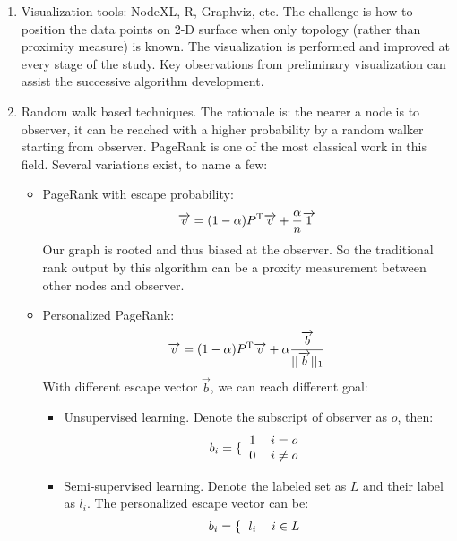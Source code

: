 \documentclass[11pt,a4paper]{article}
\begin{document}
\begin{enumerate}
	\item Visualization tools: NodeXL, R, Graphviz, etc. The challenge is
	how to position the data points on 2-D surface when only topology
	(rather than proximity measure) is 
	known. The visualization is performed and improved at every stage of 
	the study. Key observations from preliminary visualization can assist 
	the successive algorithm development. 
	\item Random walk based techniques. The rationale is: the nearer a node
	is to observer, it can be reached with a higher probability by a random 
	walker starting from observer. PageRank is one of the most classical work 
	in this field. Several variations exist, to name a few:
		\begin{itemize}
			\item PageRank with escape probability:
			\begin{equation}
				\overrightarrow{v} = (1-\alpha)P^{\rm T}\overrightarrow{v}
				+ \frac{\alpha}{n}\overrightarrow{1}
			\end{equation}
			Our graph is rooted and thus biased at the observer. So the 
			traditional rank output by this algorithm can be a proxity 
			measurement between other nodes and observer. 
			\item Personalized PageRank:
			\begin{equation}
				\overrightarrow{v} = (1-\alpha)P^{\rm T}\overrightarrow{v}
				+ \alpha\frac{\overrightarrow{b}}{||\overrightarrow{b}||_1}
			\end{equation}
			With different escape vector $\overrightarrow{b}$, we can reach 
			different goal:
				\begin{itemize}
					\item Unsupervised learning. Denote the subscript of observer
					as $o$, then:
					\begin{equation}
						b_i=\lbrace{\begin{tabular}{cc}
							1 & $i=o$ \\
							0 & $i\neq o$ 
						\end{tabular}}
					\end{equation}
					\item Semi-supervised learning. Denote the labeled set as 
					$L$ and their label as $l_i$. The personalized escape 
					vector can be:
					\begin{equation}
						b_i=\lbrace{\begin{tabular}{cc}
							$l_i$ & $i \in L $ \\

\end{tabular}}
\end{equation}
\end{itemize}
\end{itemize}
\end{enumerate}
\end{document}
